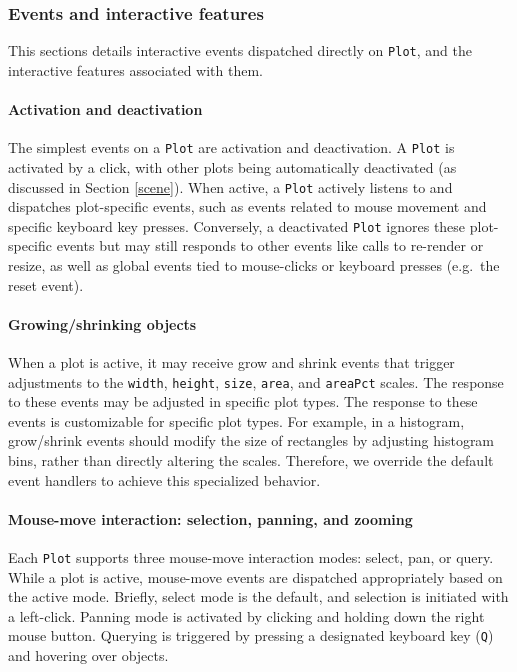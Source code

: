 \documentclass[
  openany]{book}
\theoremstyle{definition}
\theoremstyle{definition}
\theoremstyle{definition}
\theoremstyle{definition}
\theoremstyle{remark}
\begin{document}
\subsubsection{Events and interactive features}\label{events-and-interactive-features}

This sections details interactive events dispatched directly on \texttt{Plot}, and the interactive features associated with them.

\paragraph{Activation and deactivation}\label{activation-and-deactivation}

The simplest events on a \texttt{Plot} are activation and deactivation. A \texttt{Plot} is activated by a click, with other plots being automatically deactivated (as discussed in Section \ref{scene}). When active, a \texttt{Plot} actively listens to and dispatches plot-specific events, such as events related to mouse movement and specific keyboard key presses. Conversely, a deactivated \texttt{Plot} ignores these plot-specific events but may still responds to other events like calls to re-render or resize, as well as global events tied to mouse-clicks or keyboard presses (e.g.~the reset event).

\paragraph{Growing/shrinking objects}\label{growingshrinking-objects}

When a plot is active, it may receive grow and shrink events that trigger adjustments to the \texttt{width}, \texttt{height}, \texttt{size}, \texttt{area}, and \texttt{areaPct} scales. The response to these events may be adjusted in specific plot types. The response to these events is customizable for specific plot types. For example, in a histogram, grow/shrink events should modify the size of rectangles by adjusting histogram bins, rather than directly altering the scales. Therefore, we override the default event handlers to achieve this specialized behavior.

\paragraph{Mouse-move interaction: selection, panning, and zooming}\label{plot-mousemove}

Each \texttt{Plot} supports three mouse-move interaction modes: select, pan, or query. While a plot is active, mouse-move events are dispatched appropriately based on the active mode. Briefly, select mode is the default, and selection is initiated with a left-click. Panning mode is activated by clicking and holding down the right mouse button. Querying is triggered by pressing a designated keyboard key (\texttt{Q}) and hovering over objects.
\end{document}
